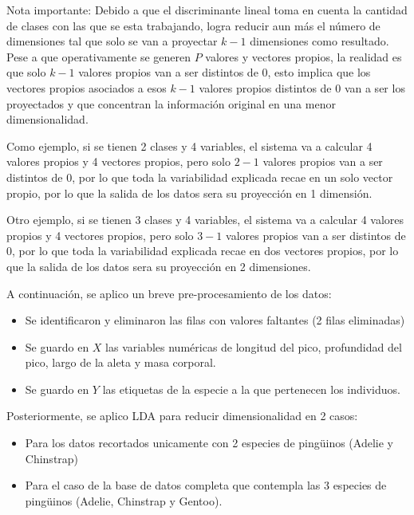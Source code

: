 \documentclass[11pt, letterpaper]{article}
\begin{document}
Nota importante: Debido a que el discriminante lineal toma en cuenta la cantidad de clases con las que se esta trabajando, logra reducir aun más el número de dimensiones tal que solo se van a proyectar $k-1$ dimensiones como resultado.
Pese a que operativamente se generen $P$ valores y vectores propios, la realidad es que solo $k-1$ valores propios van a ser distintos de 0, esto implica que los  vectores propios asociados a esos $k-1$ valores propios distintos de 0 van a ser los proyectados y que concentran la información original en una menor dimensionalidad.

Como ejemplo, si se tienen 2 clases y 4 variables, el sistema va a calcular 4 valores propios y 4 vectores propios, pero solo $2-1$ valores propios van a ser distintos de 0, por lo que toda la variabilidad explicada recae en un solo vector propio, por lo que la salida de los datos sera su proyección en 1 dimensión.

Otro ejemplo, si se tienen 3 clases y 4 variables, el sistema va a calcular 4 valores propios y 4 vectores propios, pero solo $3-1$ valores propios van a ser distintos de 0, por lo que toda la variabilidad explicada recae en dos vectores propios, por lo que la salida de los datos sera su proyección en 2 dimensiones.

\newpage

A continuación, se aplico un breve pre-procesamiento de los datos:


\begin{itemize}
	\item Se identificaron y eliminaron las filas con valores faltantes (2 filas eliminadas)
	\item Se guardo en $X$  las variables numéricas de longitud del pico, profundidad del pico, largo de la aleta y masa corporal.
	\item Se guardo en $Y$ las etiquetas de la especie a la que pertenecen los individuos.
\end{itemize}

Posteriormente, se aplico LDA para reducir dimensionalidad en 2 casos: 


\begin{itemize}
	\item Para los datos recortados unicamente con 2 especies de pingüinos (Adelie y Chinstrap)
	\item Para el caso de la base de datos completa que contempla las 3 especies de pingüinos (Adelie, Chinstrap y Gentoo).
\end{itemize}
\end{document}
